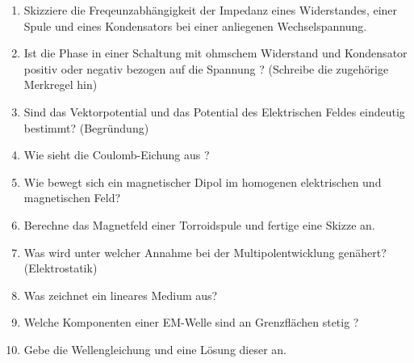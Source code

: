 \begin{enumerate}
  \item Skizziere die Freqeunzabhängigkeit der Impedanz eines Widerstandes, einer Spule und eines Kondensators
  bei einer anliegenen Wechselspannung.\\

  \item Ist die Phase in einer Schaltung mit ohmschem Widerstand und Kondensator positiv oder
  negativ bezogen auf die Spannung ? (Schreibe die zugehörige Merkregel hin) \\

  \item Sind das Vektorpotential und das Potential des Elektrischen Feldes eindeutig bestimmt? (Begründung)\\

  \item Wie sieht die Coulomb-Eichung aus ? \\

  \item Wie bewegt sich ein magnetischer Dipol im homogenen elektrischen und magnetischen Feld? \\

  \item Berechne das Magnetfeld einer Torroidspule und fertige eine Skizze an. \\

  \item Was wird unter welcher Annahme bei der Multipolentwicklung genähert? (Elektrostatik) \\

  \item Was zeichnet ein lineares Medium aus? \\

  \item Welche Komponenten einer EM-Welle sind an Grenzflächen stetig ? \\

  \item Gebe die Wellengleichung und eine Lösung dieser an. \\


\end{enumerate}
